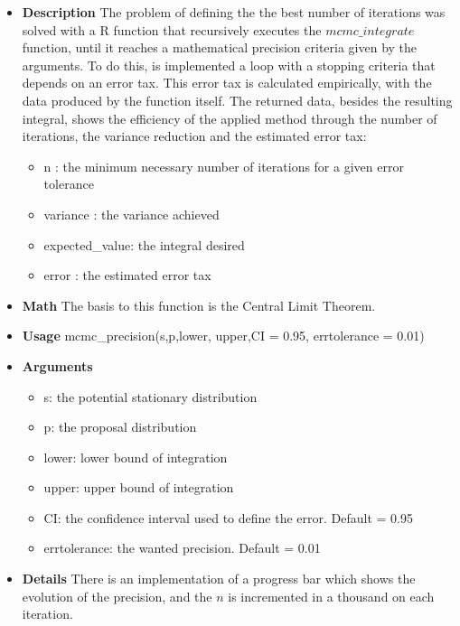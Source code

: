\documentclass{article}
\begin{document}
\begin{itemize}
    \item \textbf{Description}\newline
    The problem of defining the the best number of iterations was solved with a R function that recursively executes the $mcmc\_integrate$ function, until it reaches a mathematical  precision criteria given by the arguments. To do this, is implemented a loop with a stopping criteria that depends on an error tax. This error tax is calculated empirically, with the data produced by the function itself. The returned data, besides the resulting integral, shows the efficiency of the applied method through the number of iterations, the variance reduction and the estimated error tax:
    
    \begin{itemize}
        \item n              : the minimum necessary number of iterations for a given error tolerance
        \item variance       : the variance achieved
        \item expected\_value: the integral desired      
        \item error          : the estimated error tax
    \end{itemize}
    
    \item \textbf{Math}\newline
    The basis to this function is the Central Limit Theorem.
    
    \item \textbf{Usage}\newline
    mcmc\_precision(s,p,lower, upper,CI = 0.95, errtolerance = 0.01)
    
    \item \textbf{Arguments}
    
    \begin{itemize}
        \item s: the potential stationary distribution 
        \item p: the proposal distribution
        \item lower: lower bound of integration
        \item upper: upper bound of integration
        \item CI: the confidence interval used to define the error. Default = 0.95
        \item errtolerance: the wanted precision. Default = 0.01
    \end{itemize}
    \item \textbf{Details}\newline
    There is an implementation of a progress bar which shows the evolution of the precision, and the $n$ is incremented in a thousand on each iteration.
\end{itemize}


\end{document}
